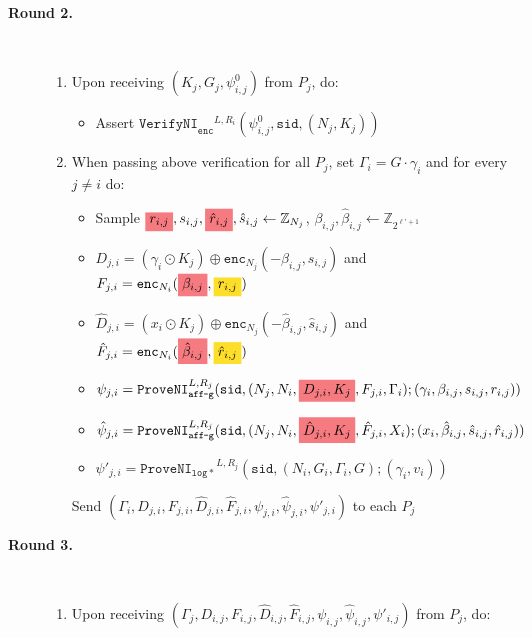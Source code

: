 \documentclass[11pt]{article}
\newcommand{\enci}[1]{\ensuremath{\mathtt{enc}_{N_{#1}}}}
\newcommand{\sid}{\ensuremath{\mathtt{sid}}}
\newcommand{\proveni}[1]{\ensuremath{\mathtt{ProveNI}_{\mathtt{#1}}}}
\newcommand{\verifyni}[1]{\ensuremath{\mathtt{VerifyNI}_{\mathtt{#1}}}}
\newcommand{\changed}[1]{\colorbox{Salmon}{$\displaystyle #1$}}
\newcommand{\note}[1]{\colorbox{Goldenrod}{$\displaystyle #1$}}
\newcommand{\Z}{\mathbb{Z}}
\newcommand{\?}[1]{\stackrel{?}{#1}}
\begin{document}
{\begin{description}
    \item[\textbf{Round 2.}] \
    \begin{enumerate}
        \item Upon receiving $(K_j, G_j, \psi^0_{i,j})$ from $P_j$, do:
            \begin{itemize}
                \item Assert $\verifyni{enc}^{L,R_i}(\psi^0_{i,j}, \sid, (N_j, K_j))$ 
            \end{itemize}
        \item When passing above verification for all $P_j$, set $\Gamma_i = G \cdot \gamma_i$ and for every $j \ne i$ do:
        \begin{itemize}
            \item Sample $\changed{r_{i,j}}, s_{i,j}, \changed{\hat{r}_{i,j}}, \hat{s}_{i,j} \gets \Z_{N_j}$,
                $\beta_{i,j}, \hat{\beta}_{i,j} \gets \Z_{2^{\ell' + 1}}$
            \item $D_{j,i} = (\gamma_i \odot K_j) \oplus \enci{j}(-\beta_{i,j}, s_{i,j})$
                and $F_{j,i} = \enci{i}(\changed{\beta_{i,j}}, \note{r_{i,j}})$
            \item $\hat{D}_{j,i} = (x_i \odot K_j) \oplus \enci{j}(-\hat{\beta}_{i,j}, \hat{s}_{i,j})$
                and $\hat{F}_{j,i} = \enci{i}(\changed{\hat{\beta}_{i,j}}, \note{\hat{r}_{i,j}})$
            \item $\psi_{j,i} = \proveni{aff\mbox{-}g}^{L,R_j}(\sid, (N_j, N_i, \changed{D_{j,i}, K_j}, F_{j,i}, \Gamma_i); (\gamma_i, \beta_{i,j}, s_{i,j}, r_{i,j}))$
            \item $\hat{\psi}_{j,i} = \proveni{aff\mbox{-}g}^{L,R_j}(\sid, (N_j, N_i, \changed{\hat{D}_{j,i}, K_j}, \hat{F}_{j,i}, X_i); (x_i, \hat{\beta}_{i,j}, \hat{s}_{i,j}, \hat{r}_{i,j}))$
            \item $\psi'_{j,i} = \proveni{log*}^{L,R_j}(\sid, (N_i, G_i, \Gamma_i, G); (\gamma_i, v_i))$
        \end{itemize}
        Send $(\Gamma_i, D_{j,i}, F_{j,i}, \hat{D}_{j,i}, \hat{F}_{j,i}, \psi_{j,i}, \hat{\psi}_{j,i}, \psi'_{j,i})$
        to each $P_j$
    \end{enumerate}

    \item[\textbf{Round 3.}] \ 
    \begin{enumerate}
        \item Upon receiving $(\Gamma_j, D_{i,j}, F_{i,j}, \hat{D}_{i,j}, \hat{F}_{i,j}, \psi_{i,j}, \hat{\psi}_{i,j}, \psi'_{i,j})$ from $P_j$, do:


\end{enumerate}
\end{description}}
\end{document}
